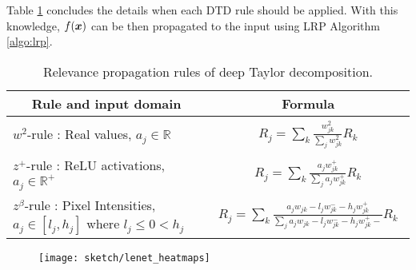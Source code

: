 %

Table \ref{tab:lrp_deep_taylor_rules} concludes the details  when each DTD rule should be applied. With this knowledge, $f(\boldsymbol{x})$ can be then propagated to the input using LRP Algorithm \ref{algo:lrp}.


\renewcommand{\arraystretch}{1}
\begin{table}[h]
\centering
\begin{tabular}{|l|l|}
\hline
\multicolumn{1}{|c|}{Rule and input domain} & \multicolumn{1}{c|}{Formula} \\ \hline
$w^2$-rule : Real values,  $a_j \in \mathbb{R}$ & \parbox{1cm}{
	\begin{align*}
		R_j =	\sum_k \frac{ w_{jk}^2  }{\sum_{j} w_{jk}^2}  R_k  	
    \end{align*}}
 \\ \hline
$z^+$-rule : ReLU activations, $a_j \in \mathbb{R}^+$    & \parbox{1cm}{\begin{align*}
R_j = \sum_k  \frac{ a_j  w_{jk}^+   }{\sum_{j}  a_j w_{jk}^+  }  R_k	
\end{align*}} \\ \hline
$z^\beta$-rule : Pixel Intensities, $ a_j \in [l_j , h_j]$ where $l_j \le 0 < h_j $  & \parbox{1cm}{\begin{align*}
R_j = \sum_k  \frac{ a_j  w_{jk} - l_j w_{jk}^- - h_j w_{jk}^+  }{\sum_{j}   a_j  w_{jk} - l_j w_{jk}^- - h_j w_{jk}^+  -}  R_k	
\end{align*}}
               \\ \hline
\end{tabular}
\caption{Relevance propagation rules of deep Taylor decomposition. }
\label{tab:lrp_deep_taylor_rules}
\end{table}
\renewcommand{\arraystretch}{1}


\begin{figure}[!htb]
\centering
\texttt{[image: sketch/lenet\_heatmaps]}
\label{fig:lenet_heatmaps}
\end{figure}


